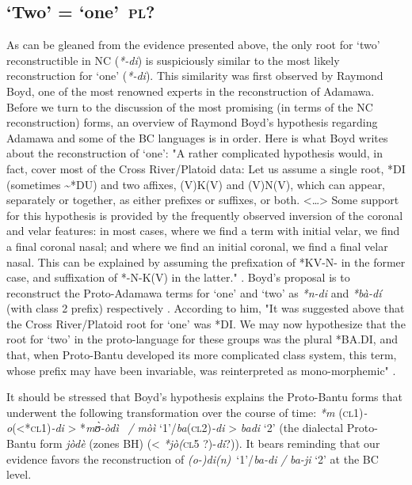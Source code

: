 \subsection{ ‘Two’ = ‘one’~\textsc{pl}?}%
As can be gleaned from the evidence presented above, the only root for ‘two’ reconstructible in NC (\textit{*-di}) is suspiciously similar to the most likely reconstruction for ‘one’ (\textit{*-di}). This similarity was first observed by Raymond Boyd, one of the most renowned experts in the reconstruction of Adamawa. Before we turn to the discussion of the most promising (in terms of the NC reconstruction) forms, an overview of Raymond Boyd’s hypothesis regarding Adamawa and some of the BC languages is in order. Here is what Boyd writes about the reconstruction of ‘one’: "A rather complicated hypothesis would, in fact, cover most of the Cross River/Platoid data: Let us assume a single root, *DI (sometimes {\textasciitilde}*DU) and two affixes, (V)K(V) and (V)N(V), which can appear, separately or together, as either prefixes or suffixes, or both. <…> Some support for this hypothesis is provided by the frequently observed inversion of the coronal and velar features: in most cases, where we find a term with initial velar, we find a final coronal nasal; and where we find an initial coronal, we find a final velar nasal. This can be explained by assuming the prefixation of *KV-N- in the former case, and suffixation of *-N-K(V) in the latter." \citep[151--152]{Boyd1989}. Boyd’s proposal is to reconstruct the Proto-Adamawa terms for ‘one’  and ‘two’ as \textit{*n-di} and \textit{*bà-dí} (with class 2 prefix) respectively \citep[156]{Boyd1989}. According to him, "It was suggested above that the Cross River/Platoid root for ‘one’ was *DI. We may now hypothesize that the root for ‘two’ in the proto-language for these groups was the plural *BA.DI, and that, when Proto-Bantu developed its more complicated class system, this term, whose prefix may have been invariable, was reinterpreted as mono-morphemic" \citep[157]{Boyd1989}. 

It should be stressed that Boyd’s hypothesis explains the Proto-Bantu forms that underwent the following transformation over the course of time: \textit{*m} (\textsc{cl}1)\textit{-o}(<*\textsc{cl}1)\textit{-di} > *\textit{m{\`{ʊ}}-òdì~} \textit{/} \textit{mòì} ‘1’/\textit{ba}(\textsc{cl}2)\textit{-di} > \textit{badi} ‘2’ (the dialectal Proto-Bantu form \textit{jòdè} (zones BH) (< \textit{*jò(}\textsc{cl}5 ?)-\textit{di}?)). It bears reminding that our evidence favors the reconstruction of \textit{(o-)di(n)}~‘1’/\textit{ba-di} \textit{/} \textit{ba-ji} ‘2’ at the BC level. 

